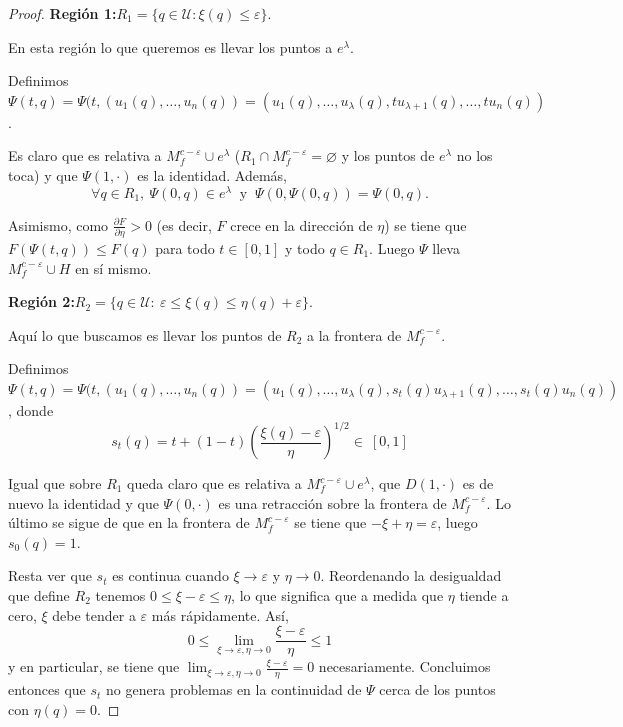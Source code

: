 \begin{proof}
    \textbf{Región 1:}\quad $R_1=\{q\in\mathcal{U}:\xi(q)\le \varepsilon\}$.
    
    En esta región lo que queremos es llevar los puntos a $e^{\lambda}$.

    Definimos $\Psi(t,q)=\Psi(t,(u_1(q),\dots,u_n(q))=(u_1(q),\dots,u_{\lambda}(q),tu_{\lambda+1}(q),\dots,tu_n(q))$.
    \bigskip
    
    Es claro que es relativa a $M^{c-\varepsilon}_f\cup e^{\lambda}$ ($R_1\cap M^{c-\varepsilon}_f=\varnothing$ y los puntos de $e^{\lambda}$ no los toca) y que  $\Psi(1,\cdot)$ es la identidad. Además,
    \begin{equation*}
        \forall q\in R_1, ~\Psi(0, q)\in e^{\lambda} ~\text{ y }~ \Psi(0,\Psi(0,q))=\Psi(0,q).
    \end{equation*} 

    Asimismo, como $\frac{\partial F}{\partial \eta}>0$ (es decir, $F$ crece en la dirección de $\eta$) se tiene que $F(\Psi(t,q))\le F(q)$ para todo $t\in [0,1]$ y todo $q\in R_1$. Luego $\Psi$ lleva $M_f^{c-\varepsilon}\cup H$ en sí mismo.
    \bigskip

    \textbf{Región 2:}\quad $R_2=\{q\in \mathcal{U}:~ \varepsilon\le \xi(q)\le \eta(q)+\varepsilon\}$.


    Aquí lo que buscamos es llevar los puntos de $R_2$ a la frontera de $M_f^{c-\varepsilon}$.

    Definimos $\Psi(t,q)=\Psi(t,(u_1(q),\dots,u_n(q))=(u_1(q),\dots,u_{\lambda}(q),s_t(q) u_{\lambda+1}(q),\dots,s_t(q) u_n(q))$, donde 
    \begin{equation*}
        s_t(q)=t + (1-t)\left(\frac{\xi(q)-\varepsilon}{\eta}\right)^{1/2} \in ~[0,1]
    \end{equation*}

    Igual que sobre $R_1$ queda claro que es relativa a $M_f^{c-\varepsilon}\cup e^{\lambda}$, que $D(1,\cdot)$ es de nuevo la identidad y que $\Psi(0,\cdot)$ es una retracción sobre la frontera de $M_f^{c-\varepsilon}$. Lo último se sigue de que en la frontera de $M_f^{c-\varepsilon}$ se tiene que $-\xi +\eta = \varepsilon$, luego $s_0(q)=1$. 
    
    Resta ver que $s_t$ es continua cuando $\xi \to \varepsilon$ y $\eta \to 0$. Reordenando la desigualdad que define $R_2$ tenemos $0\le\xi-\varepsilon\le\eta$, lo que significa que a medida que $\eta$ tiende a cero, $\xi$ debe tender a $\varepsilon$ más rápidamente. Así, 
    \begin{equation*}
        0\le \lim_{\xi \to \varepsilon, \eta\to 0} \frac{\xi - \varepsilon}{\eta} \le 1
    \end{equation*}
    y en particular, se tiene que $\lim_{\xi \to \varepsilon, \eta\to 0} \frac{\xi - \varepsilon}{\eta}=0$ necesariamente. Concluimos entonces que $s_t$ no genera problemas en la continuidad de $\Psi$ cerca de los puntos con $\eta(q)=0$.
    \bigskip


\end{proof}
